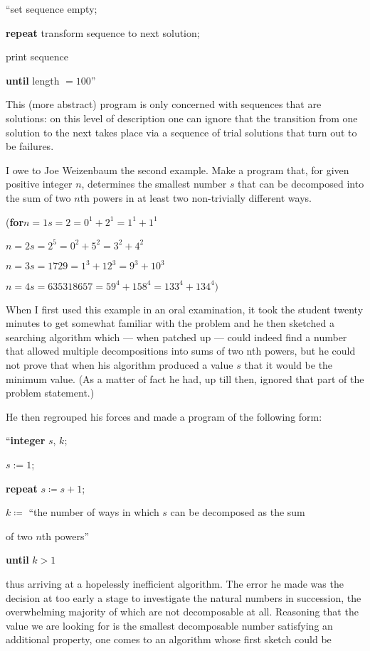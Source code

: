 ``set sequence empty;

\textbf{repeat} transform sequence to next solution;

\quad print sequence

\textbf{until} length $= 100$''

This (more abstract) program is only concerned with sequences that are solutions: on this level of description one can ignore that the transition from one solution to the next takes place via a sequence of trial solutions that turn out to be failures.

I owe to Joe Weizenbaum the second example. Make a program that, for given positive integer $n$, determines the smallest number $s$ that can be decomposed into the sum of two $n$th powers in at least two non-trivially different ways.

\noindent
(\textbf{for}\tabto{2em}$n = 1$\tabto{6em}$s = 2 = 0^1 + 2^1 = 1^1 + 1^1$

\tabto{2em}$n = 2$\tabto{6em}$s = 2^5 = 0^2 + 5^2 = 3^2 + 4^2$

\tabto{2em}$n=3$\tabto{6em}$s=1729=1^3 +12^3 =9^3 +10^3$

\tabto{2em}$n = 4$\tabto{6em}$s = 635318657 = 59^4 + 158^4 = 133^4 + 134^4)$

When I first used this example in an oral examination, it took the student twenty minutes to get somewhat familiar with the problem and he then sketched a searching algorithm which --- when patched up --- could indeed find a number that allowed multiple decompositions into sums of two nth powers, but he could not prove that when his algorithm produced a value $s$ that it would be the minimum value. (As a matter of fact he had, up till then, ignored that part of the problem statement.)

He then regrouped his forces and made a program of the following form:

``\textbf{integer} $s$, $k$;

$s:= 1$;

\textbf{repeat} $s\coloneq s + 1$;

\quad $k\coloneq$ ``the number of ways in which $s$ can be decomposed as the sum

\quad\quad of two $n$th powers''

\textbf{until} $k > 1$

\noindent
thus arriving at a hopelessly inefficient algorithm. The error he made was the decision at too early a stage to investigate the natural numbers in succession, the overwhelming majority of which are not decomposable at all. Reasoning that the value we are looking for is the smallest decomposable number satisfying an additional property, one comes to an algorithm whose first sketch could be

